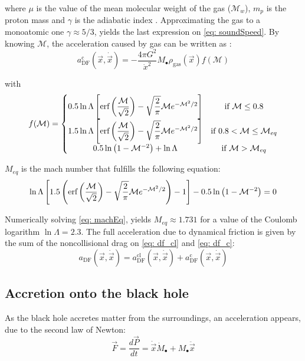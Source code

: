 			where $\mu$ is the value of the mean molecular weight of the gas ($\mathcal{M}_w$), $m_p$ is the proton mass and $\gamma$ is the adiabatic index \cite{barkana2001beginning}. Approximating the gas to a monoatomic one $\gamma \approx 5/3$, yields the last expression on \autoref{eq: soundSpeed}. By knowing $\mathcal{M}$, the acceleration caused by gas can be written as \cite{tanaka2009assembly, choksi2017recoiling}:
			\begin{equation}\label{eq: df_c}
				a^\text{c}_\text{DF}(\vec{x}, \dot{\vec{x}}) = -\dfrac{4\pi G^2}{\dot{x}^2}M_\bullet\rho_\text{gas}(\vec{x})f(\mathcal{M})
			\end{equation}
			
			with
			\begin{equation}
				f(\mathcal{M}) = \left\{
				\begin{matrix}
				0.5\ln\Lambda \left[\text{erf}\left(\dfrac{\mathcal{M}}{\sqrt{2}}\right) - \sqrt{\dfrac{2}{\pi}}\mathcal{M}e^{-\mathcal{M}^2/2}\right]& \text{if $\mathcal{M} \leq 0.8$}\\
				1.5\ln\Lambda \left[\text{erf}\left(\dfrac{\mathcal{M}}{\sqrt{2}}\right) - \sqrt{\dfrac{2}{\pi}}\mathcal{M}e^{-\mathcal{M}^2/2}\right] & \text{if $0.8 < \mathcal{M} \leq \mathcal{M}_{eq}$}\\
				0.5\ln\left(1 - \mathcal{M}^{-2}\right) + \ln\Lambda & \text{if $\mathcal{M} > \mathcal{M}_{eq}$}
				\end{matrix}
				\right.
			\end{equation}
			
			$M_{eq}$ is the mach number that fulfills the following equation:
			\begin{equation}\label{eq: machEq}
				\ln\Lambda\left[1.5\left(\text{erf}\left(\dfrac{\mathcal{M}}{\sqrt{2}}\right) - \sqrt{\dfrac{2}{\pi}}\mathcal{M}e^{-\mathcal{M}^2/2}\right) - 1\right] - 0.5\ln\left(1 - \mathcal{M}^{-2}\right) = 0
			\end{equation}
			
			Numerically solving \autoref{eq: machEq}, yields $M_{eq} \approx 1.731$ for a value of the Coulomb logarithm $\ln\Lambda = 2.3$. The full acceleration due to dynamical friction is given by the sum of the noncollisional drag on \autoref{eq: df_cl} and \autoref{eq: df_c}:
			\begin{equation}
				a_\text{DF}(\vec{x}, \dot{\vec{x}}) = a_\text{DF}^\text{cl}(\vec{x}, \dot{\vec{x}}) + a_\text{DF}^\text{c}(\vec{x}, \dot{\vec{x}})
			\end{equation}
		
		\subsection{Accretion onto the black hole}
			As the black hole accretes matter from the surroundings, an acceleration appears, due to the second law of Newton:
			\begin{equation}
				\vec{F} = \dfrac{d\vec{P}}{dt} = \dot{\vec{x}}\dot{M}_\bullet + M_\bullet\ddot{\vec{x}}
			\end{equation}
			
